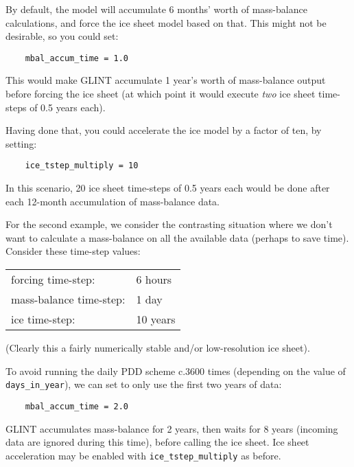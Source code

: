 By default, the model will accumulate 6 months' worth of mass-balance 
calculations, and force the ice sheet model based on that. This might not be 
desirable, so you could set:

\begin{verbatim}
    mbal_accum_time = 1.0
\end{verbatim}

This would make GLINT accumulate 1 year's worth of mass-balance output before 
forcing the ice sheet (at which point it would execute \emph{two} ice sheet 
time-steps of 0.5 years each).

Having done that, you could accelerate the ice model by a factor of ten, by 
setting:

\begin{verbatim}
    ice_tstep_multiply = 10
\end{verbatim}

In this scenario, 20 ice sheet time-steps of 0.5 years each would be done 
after each 12-month accumulation of mass-balance data.

For the second example, we consider the contrasting situation where we don't want to calculate a 
mass-balance on all the available data (perhaps to save time). Consider 
these time-step values:

\vspace{0.5cm}
\begin{tabular}{ll}
forcing time-step:   &   6 hours \\
mass-balance time-step: & 1 day \\
ice time-step:       &   10 years
\end{tabular}
\vspace{0.5cm}

(Clearly this a fairly numerically stable and/or low-resolution ice sheet).

To avoid running the daily PDD scheme c.3600 times (depending on the value of 
\texttt{days\_in\_year}), we can set to only use the first two years of data:

\begin{verbatim}
    mbal_accum_time = 2.0
\end{verbatim}

GLINT accumulates mass-balance for 2 years, then waits for 8 years (incoming 
data are ignored during this time), before calling the ice sheet. Ice sheet 
acceleration may be enabled with \texttt{ice\_tstep\_multiply} as before.
